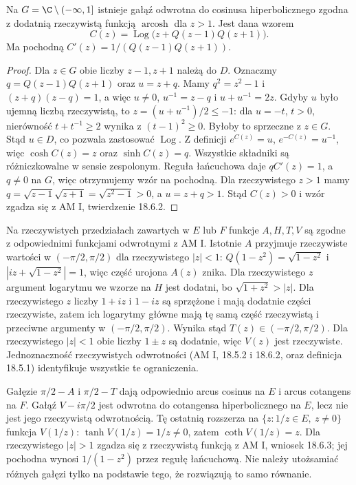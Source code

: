 \begin{twierdzenie}
\label{ma2:thm:principal-arcosh}
Na $G=\C\setminus(-\infty,1]$ istnieje gałąź
odwrotna do cosinusa hiperbolicznego zgodna z dodatnią
rzeczywistą funkcją $\operatorname{arcosh}$ dla $z>1$.
Jest dana wzorem
\[
 C(z)=\operatorname{Log}\big(z+Q(z-1)Q(z+1)\big).
\]
Ma pochodną $C'(z)=1/(Q(z-1)Q(z+1))$.
\end{twierdzenie}
\begin{proof}
Dla $z\in G$ obie liczby $z-1,z+1$ należą do $D$.
Oznaczmy $q=Q(z-1)Q(z+1)$ oraz $u=z+q$.
Mamy $q^2=z^2-1$ i $(z+q)(z-q)=1$,
a więc $u\ne0$, $u^{-1}=z-q$ i $u+u^{-1}=2z$.
Gdyby $u$ było ujemną liczbą rzeczywistą, to
$z=(u+u^{-1})/2\le-1$: dla $u=-t$, $t>0$,
nierówność $t+t^{-1}\ge2$ wynika z $(t-1)^2\ge0$.
Byłoby to sprzeczne z $z\in G$.
Stąd $u\in D$, co pozwala zastosować $\operatorname{Log}$.
Z definicji $e^{C(z)}=u$, $e^{-C(z)}=u^{-1}$,
więc $\cosh C(z)=z$ oraz $\sinh C(z)=q$.
Wszystkie składniki są różniczkowalne w sensie zespolonym.
Reguła łańcuchowa daje $qC'(z)=1$, a $q\ne0$
na $G$, więc otrzymujemy wzór na pochodną.
Dla rzeczywistego $z>1$ mamy
$q=\sqrt{z-1}\sqrt{z+1}=\sqrt{z^2-1}>0$,
a $u=z+q>1$. Stąd $C(z)>0$ i wzór zgadza się
z AM I, twierdzenie 18.6.2.
\end{proof}

\begin{uwaga}
Na rzeczywistych przedziałach zawartych w $E$ lub $F$
funkcje $A,H,T,V$ są zgodne z odpowiednimi funkcjami
odwrotnymi z AM I. Istotnie $A$ przyjmuje rzeczywiste
wartości w $(-\pi/2,\pi/2)$ dla rzeczywistego $|z|<1$:
$Q(1-z^2)=\sqrt{1-z^2}$ i
$|iz+\sqrt{1-z^2}|=1$, więc część urojona $A(z)$ znika.
Dla rzeczywistego $z$ argument logarytmu we wzorze
na $H$ jest dodatni, bo $\sqrt{1+z^2}>|z|$.
Dla rzeczywistego $z$ liczby $1+iz$ i $1-iz$
są sprzężone i mają dodatnie części rzeczywiste,
zatem ich logarytmy główne mają tę samą część
rzeczywistą i przeciwne argumenty w $(-\pi/2,\pi/2)$.
Wynika stąd $T(z)\in(-\pi/2,\pi/2)$.
Dla rzeczywistego $|z|<1$ obie liczby $1\pm z$
są dodatnie, więc $V(z)$ jest rzeczywiste.
Jednoznaczność rzeczywistych odwrotności
(AM I, 18.5.2 i 18.6.2, oraz definicja 18.5.1)
identyfikuje wszystkie te ograniczenia.

Gałęzie $\pi/2-A$ i $\pi/2-T$ dają odpowiednio
arcus cosinus na $E$ i arcus cotangens na $F$.
Gałąź $V-i\pi/2$ jest odwrotna do cotangensa
hiperbolicznego na $E$, lecz nie jest jego rzeczywistą
odwrotnością. Tę ostatnią rozszerza na
$\{z:1/z\in E,\ z\ne0\}$ funkcja $V(1/z)$:
$\tanh V(1/z)=1/z\ne0$, zatem $\coth V(1/z)=z$.
Dla rzeczywistego $|z|>1$ zgadza się z rzeczywistą
funkcją z AM I, wniosek 18.6.3; jej pochodna wynosi
$1/(1-z^2)$ przez regułę łańcuchową.
Nie należy utożsamiać różnych gałęzi tylko na podstawie
tego, że rozwiązują to samo równanie.
\end{uwaga}
